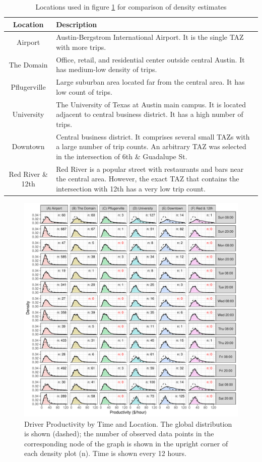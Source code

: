 \documentclass[11pt]{article}
\begin{document}
\begin{table}[htb]
    \centering
    \begin{tabular}{c|p{10cm}}
        \textbf{Location} & \textbf{Description} \\ \hline
        Airport &  Austin-Bergstrom International Airport. It is the single TAZ with more trips. \\ \hline
        The Domain & Office, retail, and residential center outside central Austin. It has medium-low density of trips. \\ \hline
        Pflugerville & Large suburban area located far from the central area. It has low count of trips.  \\ \hline
        University & The University of Texas at Austin main campus. It is located adjacent to central business district. It has a high number of trips.  \\ \hline
        Downtown &  Central business district. It comprises several small TAZs with a large number of trip counts. An arbitrary TAZ was selected in the intersection of 6th \& Guadalupe St. \\ \hline
        Red River \& 12th & Red River is a popular street with restaurants and bars near the central area. However, the exact TAZ that contains the intersection with 12th has a very low trip count.
    \end{tabular}
    \caption{Locations used in figure \ref{fig:spacetime-densities} for comparison of density estimates}
    \label{tbl:locations}
\end{table}

\begin{figure}[htb]
    \centering
    \includegraphics[width=0.98\linewidth]{img/densities_spacetime.pdf}
    \caption{Driver Productivity by Time and Location. The global distribution is shown (dashed); the number of observed data points in the corresponding node of the graph is shown in the upright corner of each density plot (n). Time is shown every 12 hours.}
    \label{fig:spacetime-densities}
\end{figure} 
\end{document}

